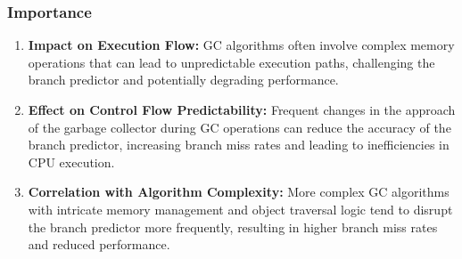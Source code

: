\documentclass[10pt]{article}
\begin{document}
\subsubsection{Importance}
\begin{enumerate}
  \item \textbf{Impact on Execution Flow:} GC algorithms often involve complex memory operations that can lead to unpredictable execution paths, challenging the branch predictor and potentially degrading performance.
  \item \textbf{Effect on Control Flow Predictability:} Frequent changes in the approach of the garbage collector during GC operations can reduce the accuracy of the branch predictor, increasing branch miss rates and leading to inefficiencies in CPU execution.
  \item \textbf{Correlation with Algorithm Complexity:} More complex GC algorithms with intricate memory management and object traversal logic tend to disrupt the branch predictor more frequently, resulting in higher branch miss rates and reduced performance.
\end{enumerate}
\end{document}
